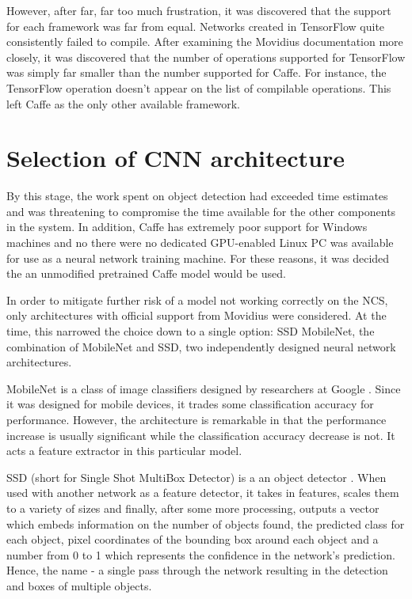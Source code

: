 However, after far, far too much frustration, it was discovered that the support for each framework was far from equal. Networks created in TensorFlow quite consistently failed to compile. After examining the Movidius documentation more closely, it was discovered that the number of operations supported for TensorFlow was simply far smaller than the number supported for Caffe. For instance, the TensorFlow  operation doesn't appear on the list of compilable operations. This left Caffe as the only other available framework.

\section{Selection of CNN architecture}
By this stage, the work spent on object detection had exceeded time estimates and was threatening to compromise the time available for the other components in the system. In addition, Caffe has extremely poor support for Windows machines and no there were no dedicated GPU-enabled Linux PC was available for use as a neural network training machine. For these reasons, it was decided the an unmodified pretrained Caffe model would be used.

In order to mitigate further risk of a model not working correctly on the NCS, only architectures with official support from Movidius were considered. At the time, this narrowed the choice down to a single option: SSD MobileNet, the combination of MobileNet and SSD, two independently designed neural network architectures.

MobileNet is a class of image classifiers designed by researchers at Google \cite{arXiv:1704.04861}. Since it was designed for mobile devices, it trades some classification accuracy for performance. However, the architecture is remarkable in that the performance increase is usually significant while the classification accuracy decrease is not. It acts a feature extractor in this particular model.

SSD (short for Single Shot MultiBox Detector) is a an object detector \cite{arXiv:1512.02325}. When used with another network as a feature detector, it takes in features, scales them to a variety of sizes and finally, after some more processing, outputs a vector which embeds information on the number of objects found, the predicted class for each object, pixel coordinates of the bounding box around each object and a number from 0 to 1 which represents the confidence in the network's prediction. Hence, the name - a single pass through the network resulting in the detection and boxes of multiple objects.

